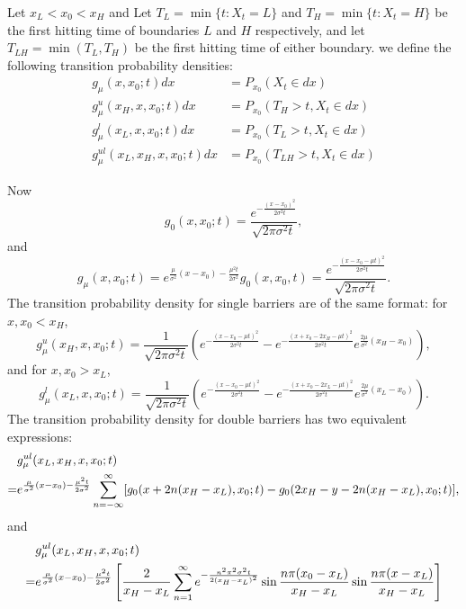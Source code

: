 Let $x_L<x_0<x_H$ and 
Let $T_L=\min \{t:X_t=L \}$ and $T_H=\min \{t:X_t=H \}$ be the first hitting
time of boundaries $L$ and $H$ respectively, and let $T_{LH}=\min(T_L,T_H)$ be
the first hitting time of either boundary.
we define the following transition probability densities:
\begin{align}
  g_{\mu}(x,x_0;t) dx &= P_{x_0}( X_t \in dx)  \\
  g^u_{\mu}(x_H,x,x_0;t) dx &= P_{x_0}( T_H>t, X_t \in dx) \\
  g^l_{\mu}(x_L,x,x_0;t) dx &= P_{x_0}( T_L>t, X_t \in dx) \\
  g^{ul}_{\mu}(x_L,x_H,x,x_0;t) dx &= P_{x_0}( T_{LH}>t, X_t \in dx) 
\end{align}

Now
\begin{equation}
  g_0(x,x_0;t) 
  = \frac{e^{-\frac{(x-x_0)^2}{2\sigma^2 t}}}{\sqrt{2\pi \sigma^2 t}},
\end{equation}
and 
\begin{equation}
  g_{\mu}(x,x_0;t) 
  = e^{\frac{\mu}{\sigma^2}(x-x_0)-\frac{\mu^2 t}{2\sigma^2}} g_0(x,x_0,t)
  = \frac{e^{-\frac{(x-x_0-\mu t)^2}{2\sigma^2 t}}}{\sqrt{2\pi \sigma^2 t}}.
\end{equation}
The transition probability density for single barriers are of the same format:
for $x,x_0<x_H$,
\begin{equation}
  g^u_{\mu}(x_H,x,x_0;t)  
   = \frac{1}{\sqrt{2\pi \sigma^2 t}} 
       \left(  e^{-\frac{(x-x_0-\mu t)^2}{2\sigma^2 t}} 
             - e^{-\frac{(x+x_0-2 x_H-\mu t)^2}{2\sigma^2 t}} 
               e^{\frac{2\mu}{\sigma^2} (x_H-x_0)}
       \right),
\end{equation}
and for $x,x_0>x_L$,
\begin{equation}
  g^l_{\mu}(x_L,x,x_0;t) 
   = \frac{1}{\sqrt{2\pi \sigma^2 t}} 
       \left(  e^{-\frac{(x-x_0-\mu t)^2}{2\sigma^2 t}} 
             - e^{-\frac{(x+x_0-2 x_L-\mu t)^2}{2\sigma^2 t}} 
               e^{\frac{2\mu}{\sigma^2} (x_L-x_0)}
       \right).
\end{equation}
The transition probability density for double barriers has two equivalent
expressions:
\begin{align}
   & g^{ul}_{\mu}(x_L,x_H,x,x_0;t) \\ \notag
  =& e^{\frac{\mu}{\sigma^2}(x-x_0)-\frac{\mu^2 t}{2\sigma^2}}
     \sum_{n=-\infty}^{\infty} 
       [ g_{0}(x+2n(x_H-x_L),x_0;t) - g_{0}(2x_H-y-2n(x_H-x_L),x_0;t) ],
\end{align}
and
\begin{align}
  & g^{ul}_{\mu}(x_L,x_H,x,x_0;t) \\ \notag
 =& e^{\frac{\mu}{\sigma^2}(x-x_0)-\frac{\mu^2 t}{2\sigma^2}}
    \left[
      \frac{2}{x_H-x_L} 
      \sum_{n=1}^{\infty} e^{-\frac{n^2\pi^2 \sigma^2 t}{2(x_H-x_L)^2}}
 	 \sin \frac{n\pi (x_0-x_L)}{x_H-x_L} \sin \frac{n\pi (x-x_L)}{x_H-x_L}
    \right]
\end{align}






